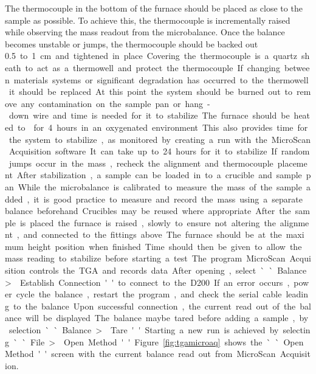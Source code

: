         The thermocouple in the bottom of the furnace should be placed as close to the sample as possible.
        To achieve this, the thermocouple is incrementally raised while observing the mass readout from the microbalance.
        Once the balance becomes unstable or jumps, the thermocouple should be backed out \SI{0.5} to \SI{1}{\centi\meter} and tightened in place.
        Covering the thermocouple is a quartz sheath to act as a thermowell and protect the thermocouple.
        If changing between materials systems or significant degradation has occurred to the thermowell it should be replaced.

        At this point the system should be burned out to remove any contamination on the sample pan or hang-down wire and time is needed for it to stabilize.
        The furnace should be heated to  for 4 hours in an oxygenated environment.
        This also provides time for the system to stabilize, as monitored by creating a run with the MicroScan Acquisition software.
        It can take up to 24 hours for it to stabilize.
        If random jumps occur in the mass, recheck the alignment and thermocouple placement.

        After stabilization, a sample can be loaded in to a crucible and sample pan.
        While the microbalance is calibrated to measure the mass of the sample added, it is good practice to measure and record the mass using a separate balance beforehand.
        Crucibles may be reused where appropriate.
        After the sample is placed the furnace is raised, slowly to ensure not altering the alignment, and connected to the fittings above.
        The furnace should be at the maximum height position when finished.
        Time should then be given to allow the mass reading to stabilize before starting a test.

        The program MicroScan Acquisition controls the TGA and records data.
        After opening, select ``Balance \textgreater{} Establish Connection'' to connect to the D200.
        If an error occurs, power cycle the balance, restart the program, and check the serial cable leading to the balance.
        Upon successful connection, the current read out of the balance will be displayed.
        The balance maybe tared before adding a sample, by selection ``Balance \textgreater{} Tare.''
        Starting a new run is achieved by selecting ``File \textgreater{} Open Method.''
        Figure \ref{fig:tgamicroaq} shows the ``Open Method'' screen with the current balance read out from MicroScan Acquisition.

